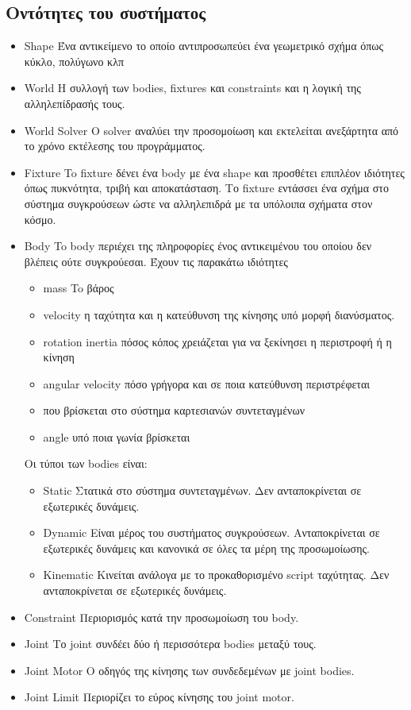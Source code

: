 \subsection{Οντότητες του συστήματος}
\begin{itemize}
\item Shape
Ένα αντικείμενο το οποίο αντιπροσωπεύει ένα γεωμετρικό σχήμα όπως κύκλο, πολύγωνο κλπ
\item World
Η συλλογή των bodies, fixtures και constraints και η λογική της αλληλεπίδρασής τους.
\item World Solver
Ο solver αναλύει την προσομοίωση και εκτελείται ανεξάρτητα από το χρόνο εκτέλεσης του προγράμματος.
\item Fixture 
To fixture δένει ένα body με ένα shape και προσθέτει επιπλέον ιδιότητες όπως πυκνότητα, τριβή και αποκατάσταση. Το fixture εντάσσει ένα σχήμα στο σύστημα συγκρούσεων ώστε να αλληλεπιδρά με τα υπόλοιπα σχήματα στον κόσμο.
\item Body 
To body περιέχει της πληροφορίες ένος αντικειμένου του οποίου δεν βλέπεις ούτε συγκρούεσαι. Έχουν τις παρακάτω ιδιότητες
	\begin{itemize}
		\item mass To βάρος
		\item velocity η ταχύτητα και η κατεύθυνση της κίνησης υπό μορφή διανύσματος.
		\item rotation inertia πόσος κόπος χρειάζεται για να ξεκίνησει η περιστροφή ή η κίνηση
		\item angular velocity πόσο γρήγορα και σε ποια κατεύθυνση περιστρέφεται
		\item που βρίσκεται στο σύστημα καρτεσιανών συντεταγμένων
		\item angle υπό ποια γωνία βρίσκεται
	\end{itemize}
Οι τύποι των bodies είναι:
	\begin{itemize}
		\item Static
		Στατικά στο σύστημα συντεταγμένων. Δεν ανταποκρίνεται σε εξωτερικές δυνάμεις.
		\item Dynamic
		Είναι μέρος του συστήματος συγκρούσεων. Ανταποκρίνεται σε εξωτερικές δυνάμεις και κανονικά σε όλες τα μέρη της προσωμοίωσης.
		\item Kinematic 
		Κινείται ανάλογα με το προκαθορισμένο script ταχύτητας. Δεν ανταποκρίνεται σε εξωτερικές δυνάμεις.
	\end{itemize}
\item Constraint
Περιορισμός κατά την προσωμοίωση του body.
\item Joint 
Το joint συνδέει δύο ή περισσότερα bodies μεταξύ τους.
\item Joint Motor
Ο οδηγός της κίνησης των συνδεδεμένων με joint bodies. 
\item Joint Limit
Περιορίζει το εύρος κίνησης του joint motor.
\end{itemize}

